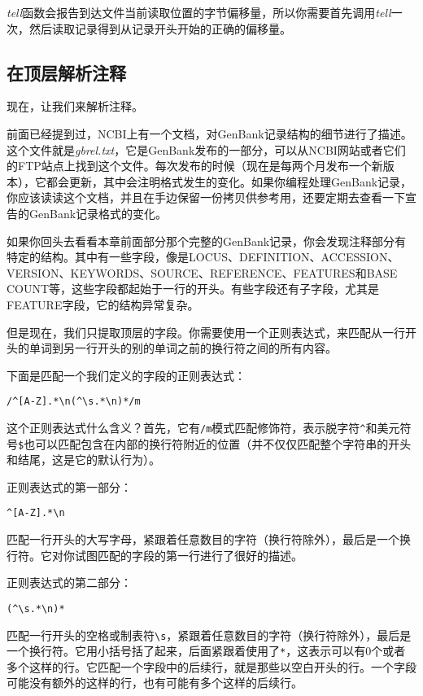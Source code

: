 \textit{tell}函数会报告到达文件当前读取位置的字节偏移量，所以你需要首先调用\textit{tell}一次，然后读取记录得到从记录开头开始的正确的偏移量。

\subsection{在顶层解析注释}
现在，让我们来解析注释。

前面已经提到过，NCBI上有一个文档，对GenBank记录结构的细节进行了描述。这个文件就是\textit{gbrel.txt}，它是GenBank发布的一部分，可以从NCBI网站或者它们的FTP站点上找到这个文件。每次发布的时候（现在是每两个月发布一个新版本），它都会更新，其中会注明格式发生的变化。如果你编程处理GenBank记录，你应该读读这个文档，并且在手边保留一份拷贝供参考用，还要定期去查看一下宣告的GenBank记录格式的变化。

如果你回头去看看本章前面部分那个完整的GenBank记录，你会发现注释部分有特定的结构。其中有一些字段，像是LOCUS、DEFINITION、ACCESSION、VERSION、KEYWORDS、SOURCE、REFERENCE、FEATURES和BASE COUNT等，这些字段都起始于一行的开头。有些字段还有子字段，尤其是FEATURE字段，它的结构异常复杂。

但是现在，我们只提取顶层的字段。你需要使用一个正则表达式，来匹配从一行开头的单词到另一行开头的别的单词之前的换行符之间的所有内容。

下面是匹配一个我们定义的字段的正则表达式：

\begin{lstlisting}
/^[A-Z].*\n(^\s.*\n)*/m
\end{lstlisting}

这个正则表达式什么含义？首先，它有\verb|/m|模式匹配修饰符，表示脱字符\verb|^|和美元符号\verb|$|也可以匹配包含在内部的换行符附近的位置（并不仅仅匹配整个字符串的开头和结尾，这是它的默认行为）。

正则表达式的第一部分：
  
\begin{lstlisting}
^[A-Z].*\n
\end{lstlisting}

匹配一行开头的大写字母，紧跟着任意数目的字符（换行符除外），最后是一个换行符。它对你试图匹配的字段的第一行进行了很好的描述。

正则表达式的第二部分：
  
\begin{lstlisting}
(^\s.*\n)*
\end{lstlisting}

匹配一行开头的空格或制表符\verb|\s|，紧跟着任意数目的字符（换行符除外），最后是一个换行符。它用小括号括了起来，后面紧跟着使用了\verb|*|，这表示可以有0个或者多个这样的行。它匹配一个字段中的后续行，就是那些以空白开头的行。一个字段可能没有额外的这样的行，也有可能有多个这样的后续行。

